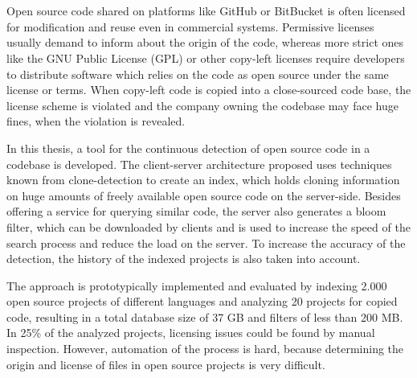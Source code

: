 \chapter{\abstractname}
Open source code shared on platforms like GitHub or BitBucket is often licensed for modification and reuse even in commercial systems.
Permissive licenses usually demand to inform about the origin of the code, whereas more strict ones like the GNU Public License (GPL) or other copy-left licenses require developers to distribute software which relies on the code as open source under the same license or terms.
When copy-left code is copied into a close-sourced code base, the license scheme is violated and the company owning the codebase may face huge fines, when the violation is revealed.

In this thesis, a tool for the continuous detection of open source code in a codebase is developed.
The client-server architecture proposed uses techniques known from clone-detection to create an index, which holds cloning information on huge amounts of freely available open source code on the server-side.
Besides offering a service for querying similar code, the server also generates a bloom filter, which can be downloaded by clients and is used to increase the speed of the search process and reduce the load on the server.
To increase the accuracy of the detection, the history of the indexed projects is also taken into account.

The approach is prototypically implemented and evaluated by indexing 2.000 open source projects of different languages and analyzing 20 projects for copied code, resulting in a total database size of 37 GB and filters of less than 200 MB.
In 25\% of the analyzed projects, licensing issues could be found by manual inspection.
However, automation of the process is hard, because determining the origin and license of files in open source projects is very difficult.